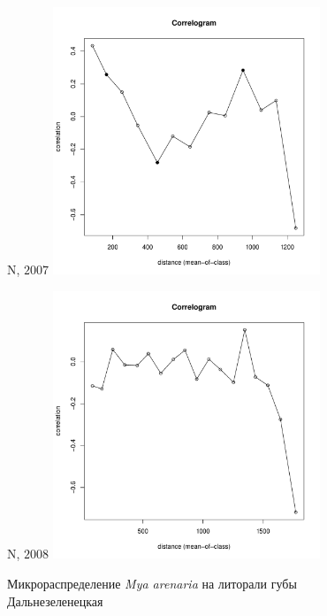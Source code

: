 	\begin{figure}[h]
	\begin{minipage}[b]{.5\linewidth}
	\begin{center}
	{\small N, $2007$}
		\includegraphics[width=80mm]{../Barenc_Sea/distribution_Moran/Plyazh07_moran_N_Mya_arenaria_.pdf}
	\end{center}
	\end{minipage}
	\hfil %
	\begin{minipage}[b]{.5\linewidth}
	\begin{center}
	{\small N, $2008$}
		\includegraphics[width=80mm]{../Barenc_Sea/distribution_Moran/Plyazh0812_moran_N_Mya_arenaria_.pdf}
	\end{center}
	\end{minipage}

	\caption{Микрораспределение {\it Mya arenaria} на литорали губы Дальнезеленецкая}
	\label{ris:moransI_Plyazh_Mya}
	\end{figure}

